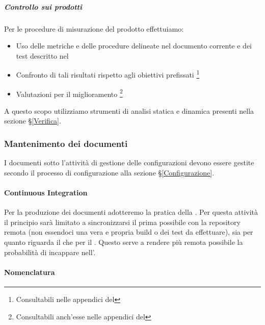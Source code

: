 			\subparagraph{Controllo sui prodotti}	\label{ControlloProdotti}
			Per le procedure di misurazione del prodotto effettuiamo:
			\begin{itemize}
				\item Uso delle metriche e delle procedure delineate nel documento corrente e dei test descritto nel \PdQv
				\item Confronto di tali risultati rispetto agli obiettivi prefissati \footnote{Consultabili nelle appendici del \PdQv}
				\item Valutazioni per il miglioramento \footnote{Consultabili anch'esse nelle appendici del \PdQv}
			\end{itemize}
			A questo scopo utilizziamo strumenti di analisi statica e dinamica presenti nella sezione \S\ref{Verifica}.


		\subsubsection{Mantenimento dei documenti}\label{Mantenimento}
		I documenti sotto l'attività di gestione delle configurazioni devono essere gestite secondo il processo di configurazione alla sezione \S\ref{Configurazione}.

			\paragraph{Continuous Integration}\label{ContinuousIntegration}
			Per la produzione dei documenti adotteremo la pratica della .
			Per questa attività il principio sarà limitato a sincronizzarsi il prima possibile con la repository remota (non essendoci una vera e propria build o dei test da effettuare),
			sia per quanto riguarda il  che per il .
			Questo serve a rendere più remota possibile la probabilità di incappare nell'.

			\paragraph{Nomenclatura}

